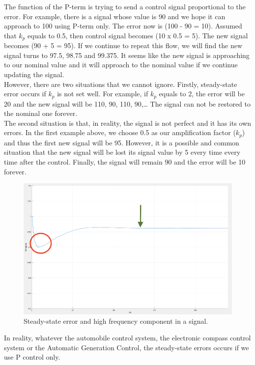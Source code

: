\documentclass{report}
\begin{document}
 The function of the P-term is trying to send a control signal proportional to the error. For example, there is a signal whose value is 90 and we hope it can approach to 100 using P-term only. The error now is (100 - 90 = 10). Assumed that $k_p$ equals to 0.5, then control signal becomes (10 x 0.5 = 5). The new signal becomes (90 + 5 = 95). If we continue to repeat this flow, we will find the new signal turns to 97.5, 98.75 and 99.375. It seems like the new signal is approaching to our nominal value and it will approach to the nominal value if we continue updating the signal.\\
 

However, there are two situations that we cannot ignore. Firstly, steady-state error occurs if $k_p$ is not set well. For example, if $k_p$ equals to 2, the error will be 20 and the new signal will be 110, 90, 110, 90,… The signal can not be restored to the nominal one forever. \\

The second situation is that, in reality, the signal is not perfect and it has its own errors. In the first example above, we choose 0.5 as our amplification factor ($k_p$) and thus the first new signal will be 95. However, it is a possible and common situation that the new signal will be lost its signal value by 5 every time every time after the control. Finally, the signal will remain 90 and the error will be 10 forever. \\

\begin{figure}[htbp]
\centering
\includegraphics[width = .891\textwidth]{figure/3_2_steady.png}
\caption{Steady-state error and high frequency component in a signal.}
\label{3_2_steady}
\end{figure}

In reality, whatever the automobile control system, the electronic compass control system or the Automatic Generation Control, the steady-state errors occurs if we use P control only.\\
\end{document}
